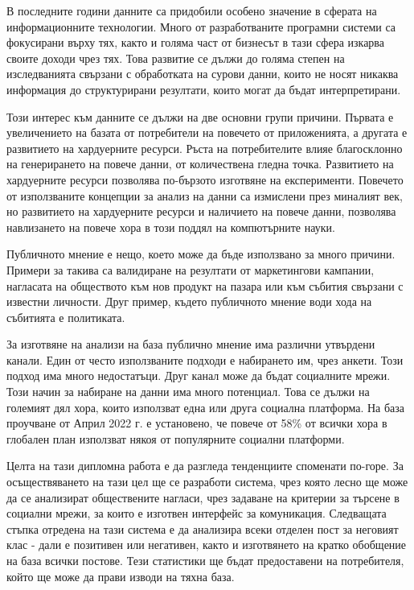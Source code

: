 \documentclass{article}
\begin{document}
В последните години данните са придобили особено значение в сферата на информационните технологии. Много от
разработваните програмни системи са фокусирани върху тях, както и голяма част от бизнесът в тази сфера изкарва своите
доходи чрез тях. Това развитие се дължи до голяма степен на изследванията свързани с обработката на сурови данни,
които не носят никаква информация до структурирани резултати, които могат да бъдат интерпретирани.

Този интерес към данните се дължи на две основни групи причини. Първата е увеличението на базата от потребители на
повечето от приложенията, а другата е развитието на хардуерните ресурси. Ръста на потребителите влияе благосклонно на
генерирането на повече данни, от количествена гледна точка. Развитието на хардуерните ресурси позволява по-бързото
изготвяне на експерименти. Повечето от използваните концепции за анализ на данни са измислени през миналият век, но
развитието на хардуерните ресурси и наличието на повече данни, позволява навлизането на повече хора в този поддял на
компютърните науки.

Публичното мнение е нещо, което може да бъде използвано за много причини. Примери за такива са валидиране на резултати
от маркетингови кампании, нагласата на обществото към нов продукт на пазара или към събития свързани с известни
личности. Друг пример, където публичното мнение води хода на събитията е политиката.

За изготвяне на анализи на база публично мнение има различни утвърдени канали. Един от често използваните подходи е
набирането им, чрез анкети. Този подход има много недостатъци. Друг канал може да бъдат социалните мрежи. Този начин за
набиране на данни има много потенциал. Това се дължи на големият дял хора, които използват една или друга социална
платформа. На база проучване от Април 2022 г. е установено, че повече от 58\% от всички хора в глобален план използват
някоя от популярните социални платформи. \cite{social-media-users}

Целта на тази дипломна работа е да разгледа тенденциите споменати по-горе. За осъществяването на тази цел ще се
разработи система, чрез която лесно ще може да се анализират обществените нагласи, чрез задаване на критерии за търсене
в социални мрежи, за които е изготвен интерфейс за комуникация. Следващата стъпка отредена на тази система е да
анализира всеки отделен пост за неговият клас - дали е позитивен или негативен, както и изготвянето на кратко обобщение
на база всички постове. Тези статистики ще бъдат предоставени на потребителя, който ще може да прави изводи на тяхна
база.
\end{document}
